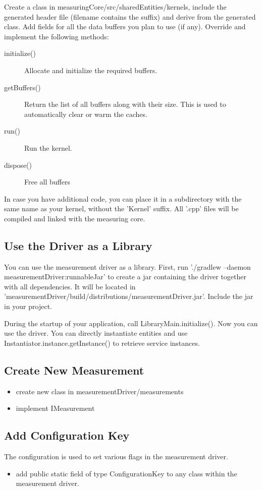 \documentclass[a4paper,12pt]{article}
\newcommand{\method}[1]{\textsf{#1}}
\begin{document}
Create a class in measuringCore/src/sharedEntities/kernels, include the
generated header file (filename contains the suffix) and derive from the
generated class. Add fields for all the data buffers you plan to use
(if any). Override and implement the following methods:
\begin{description}
\item[\method{initialize()}] Allocate and initialize the required buffers.
\item[\method{getBuffers()}] Return the list of all buffers along with their
size. This is used to automatically clear or warm the caches.
\item[\method{run()}] Run the kernel.
\item[\method{dispose()}] Free all buffers
\end{description}

In case you have additional code, you can place it in a subdirectory with the
same name as your kernel, without the 'Kernel' suffix. All '.cpp' files will be
compiled and linked with the measuring core.

\subsection{Use the Driver as a Library}
You can use the measurement driver as a library. First, run './gradlew
--daemon measurementDriver:runnableJar' to create a jar containing the driver
together with all dependencies. It will be located in
'measurementDriver/build/distributions/measurementDriver.jar'. Include the jar
in your project.

During the startup of your application, call LibraryMain.initialize(). Now you
can use the driver. You can directly instantiate entities and use
\method{Instantiator.instance.getInstance()} to retrieve service instances.

\subsection{Create New Measurement}
\begin{itemize}
\item create new class in measurementDriver/measurements
\item implement IMeasurement
\end{itemize}

\subsection{Add Configuration Key}
The configuration is used to set various flags in the measurement driver.
\begin{itemize}
\item add public static field of type ConfigurationKey to any class within the
measurement driver.
\end{itemize}
\end{document}
